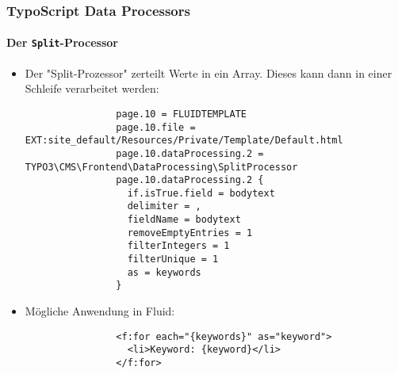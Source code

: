 \begin{frame}[fragile]
	\frametitle{TypoScript Data Processors}
	\framesubtitle{Der \texttt{Split}-Processor}

	\lstset{basicstyle=\tiny\ttfamily}

	\begin{itemize}

		\item Der "Split-Prozessor" zerteilt Werte in ein Array.\newline
			Dieses kann dann in einer Schleife verarbeitet werden:

			\begin{lstlisting}
				page.10 = FLUIDTEMPLATE
				page.10.file = EXT:site_default/Resources/Private/Template/Default.html
				page.10.dataProcessing.2 = TYPO3\CMS\Frontend\DataProcessing\SplitProcessor
				page.10.dataProcessing.2 {
				  if.isTrue.field = bodytext
				  delimiter = ,
				  fieldName = bodytext
				  removeEmptyEntries = 1
				  filterIntegers = 1
				  filterUnique = 1
				  as = keywords
				}
			\end{lstlisting}

		\item Mögliche Anwendung in Fluid:

			\begin{lstlisting}
				<f:for each="{keywords}" as="keyword">
				  <li>Keyword: {keyword}</li>
				</f:for>
			\end{lstlisting}

	\end{itemize}

\end{frame}


